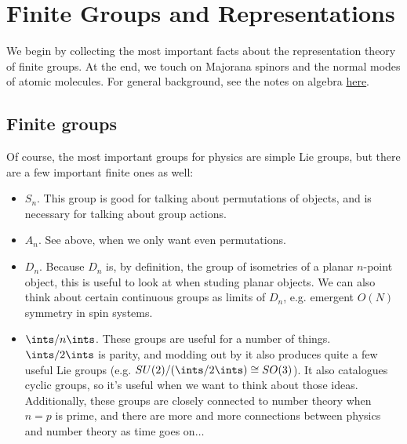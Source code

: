 \documentclass[11pt]{article}
\begin{document}

\newpage
\microtoc
\newpage


\section{Finite Groups and Representations}

We begin by collecting the most important facts about the representation
theory of finite groups. At the end, we touch on Majorana spinors and the normal
modes of atomic molecules. For general background, see the notes on
algebra \href{https://github.com/will-lancer/notes/blob/main/Mathematics/coreMath/coreMath.pdf}{here}.

\subsection{Finite groups}

\begin{eexample}
    Of course, the most important groups for physics are simple
    Lie groups, but there are a few important finite ones as well:
    \begin{itemize}
        \item $S_n$. This group is good for talking about permutations
        of objects, and is necessary for talking about group actions.
        \item $A_n$. See above, when we only want even permutations.
        \item $D_n$. Because $D_n$ is, by definition, the group of isometries
        of a planar $n$-point object, this is useful to look at when studing
        planar objects. We can also think about certain continuous groups
        as limits of $D_n$, e.g. emergent $O(N)$ symmetry in spin systems.
        \item $\ints/n\ints$. These groups are useful for a number of things.
        $\ints/2\ints$ is parity, and modding out by it also produces quite
        a few useful Lie groups (e.g. $SU(2)/(\ints/2\ints) \cong SO(3)$). It also
        catalogues cyclic groups, so it's useful when we want to think about
        those ideas. Additionally, these groups are closely connected to number
        theory when $n = p$ is prime, and there are more and more connections
        between physics and number theory as time goes on$\ldots$
    \end{itemize}
\end{eexample}
\end{document}
